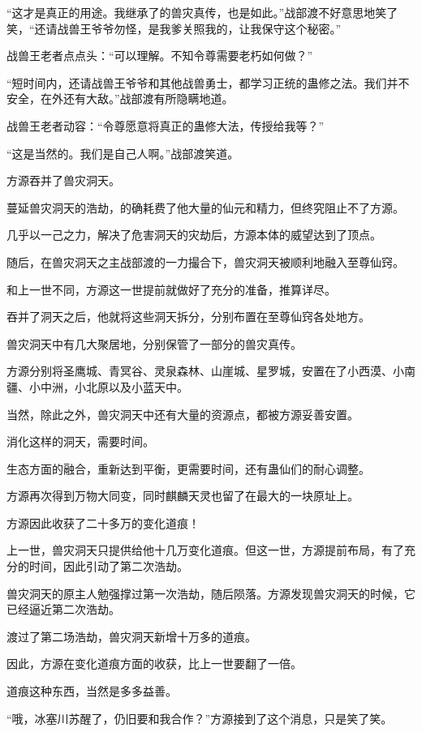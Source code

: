 \begin{this_body}
“这才是真正的用途。我继承了的兽灾真传，也是如此。”战部渡不好意思地笑了笑，“还请战兽王爷爷勿怪，是我爹关照我的，让我保守这个秘密。”

战兽王老者点点头：“可以理解。不知令尊需要老朽如何做？”

“短时间内，还请战兽王爷爷和其他战兽勇士，都学习正统的蛊修之法。我们并不安全，在外还有大敌。”战部渡有所隐瞒地道。

战兽王老者动容：“令尊愿意将真正的蛊修大法，传授给我等？”

“这是当然的。我们是自己人啊。”战部渡笑道。

方源吞并了兽灾洞天。

蔓延兽灾洞天的浩劫，的确耗费了他大量的仙元和精力，但终究阻止不了方源。

几乎以一己之力，解决了危害洞天的灾劫后，方源本体的威望达到了顶点。

随后，在兽灾洞天之主战部渡的一力撮合下，兽灾洞天被顺利地融入至尊仙窍。

和上一世不同，方源这一世提前就做好了充分的准备，推算详尽。

吞并了洞天之后，他就将这些洞天拆分，分别布置在至尊仙窍各处地方。

兽灾洞天中有几大聚居地，分别保管了一部分的兽灾真传。

方源分别将圣鹰城、青冥谷、灵泉森林、山崖城、星罗城，安置在了小西漠、小南疆、小中洲，小北原以及小蓝天中。

当然，除此之外，兽灾洞天中还有大量的资源点，都被方源妥善安置。

消化这样的洞天，需要时间。

生态方面的融合，重新达到平衡，更需要时间，还有蛊仙们的耐心调整。

方源再次得到万物大同变，同时麒麟天灵也留了在最大的一块原址上。

方源因此收获了二十多万的变化道痕！

上一世，兽灾洞天只提供给他十几万变化道痕。但这一世，方源提前布局，有了充分的时间，因此引动了第二次浩劫。

兽灾洞天的原主人勉强撑过第一次浩劫，随后陨落。方源发现兽灾洞天的时候，它已经逼近第二次浩劫。

渡过了第二场浩劫，兽灾洞天新增十万多的道痕。

因此，方源在变化道痕方面的收获，比上一世要翻了一倍。

道痕这种东西，当然是多多益善。

“哦，冰塞川苏醒了，仍旧要和我合作？”方源接到了这个消息，只是笑了笑。


\end{this_body}

